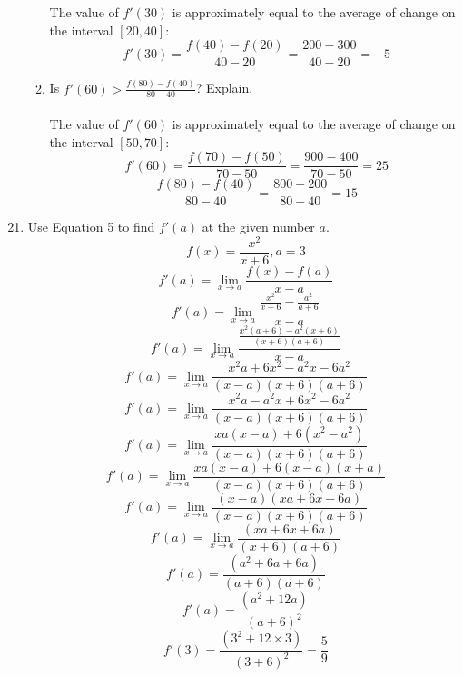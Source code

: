 \documentclass[12pt]{article}
\begin{document}
\begin{enumerate}
\begin{enumerate}
                    The value of $f'(30)$ is approximately equal to the average of change on the interval $[20,40]$:
                    \[f'(30) = {\displaystyle \frac{f(40) - f(20)}{40 - 20} = \frac{200 - 300}{40 - 20}} = -5\]
                    \noindent{}
              \item Is $f'(60) > {\displaystyle \frac{f(80) - f(40)}{80-40}}$? Explain.\\~\\
                    The value of $f'(60)$ is approximately equal to the average of change on the interval $[50,70]$:
                    \[f'(60) = {\displaystyle \frac{f(70) - f(50)}{70 - 50} = \frac{900 - 400}{70 - 50}} = 25\]
                    \[{\displaystyle \frac{f(80) - f(40)}{80-40}} = \frac{800 - 200}{80-40} = 15\]
                    \noindent{}
          \end{enumerate}

\end{enumerate}

\begin{enumerate}
    \setcounter{enumi}{20}
    \item Use Equation 5 to find $f'(a)$ at the given number $a$.\\
          \[f(x) = {\displaystyle \frac{x^2}{x+6}}, a = 3\]
          \[f'(a) = {\displaystyle \lim_{x \to a} \frac{f(x) - f(a)}{x - a}}\]
          \[f'(a) = {\displaystyle \lim_{x \to a} \frac{\frac{x^2}{x + 6} - \frac{a^2}{a + 6}}{x - a}}\]
          \[f'(a) = {\displaystyle \lim_{x \to a} \frac{\frac{x^2(a+6) - a^2(x+6)}{(x+6)(a+6)}}{x - a}}\]
          \[f'(a) = {\displaystyle \lim_{x \to a} \frac{x^2a + 6x^2 - a^2x - 6a^2}{(x - a)(x+6)(a+6)}}\]
          \[f'(a) = {\displaystyle \lim_{x \to a} \frac{x^2a - a^2x + 6x^2 - 6a^2}{(x - a)(x+6)(a+6)}}\]
          \[f'(a) = {\displaystyle \lim_{x \to a} \frac{xa(x - a) + 6(x^2 - a^2)}{(x - a)(x+6)(a+6)}}\]
          \[f'(a) = {\displaystyle \lim_{x \to a} \frac{xa(x - a) + 6(x - a)(x+a)}{(x - a)(x+6)(a+6)}}\]
          \[f'(a) = {\displaystyle \lim_{x \to a} \frac{(x - a)(xa + 6x + 6a)}{(x - a)(x+6)(a+6)}}\]
          \[f'(a) = {\displaystyle \lim_{x \to a} \frac{(xa + 6x + 6a)}{(x+6)(a+6)}}\]
          \[f'(a) = {\displaystyle \frac{(a^2 + 6a + 6a)}{(a+6)(a+6)}}\]
          \[f'(a) = {\displaystyle \frac{(a^2 + 12a)}{(a+6)^2}}\]
          \[f'(3) = {\displaystyle \frac{(3^2 + 12\times3)}{(3+6)^2}} = \boxed{\frac{5}{9}}\]
\end{enumerate}
\end{document}
